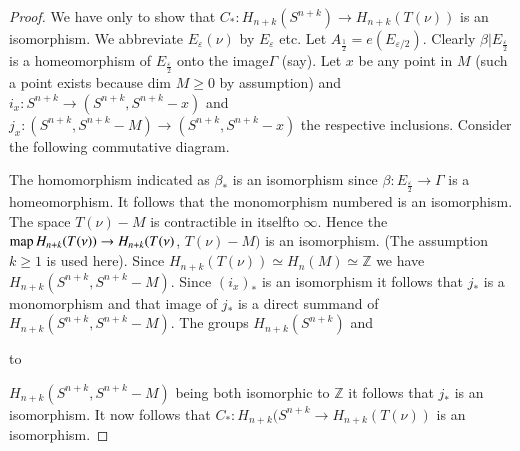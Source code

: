  \begin{proof}
We have only to show that $C_* : H_{n+k} (S^{n+k}) \to H_{n+k}
(T(\nu))$ is an isomorphism. We abbreviate $E_\varepsilon (\nu)$ by
$E_\varepsilon$ etc. Let $A_{\frac{1}{2}} = e(E_{\varepsilon/2})$. Clearly $\beta|
E_{\frac{\varepsilon}{2}}$ is a homeomorphism of $E_{\frac{\varepsilon}{2}}$ onto
the image\pageoriginale $\Gamma$ (say). Let $x$ be any point in $M$
(such a point exists because dim $M \geq 0$ by assumption) and $i_x :
S^{n+k} \to (S^{n+k}, S^{n+k} - x)$ and $j_x: (S^{n+k},
S^{n+k}-M) \to (S^{n+k}, S^{n+k}-x)$ the respective inclusions. Consider
the following commutative diagram.  

{\parfillskip=0pt
 The homomorphism indicated as $\beta_*$ is an isomorphism since
 $\beta : E_{\frac{\varepsilon}{2}} \to \Gamma$ is a homeomorphism. It
 follows that the monomorphism numbered  is an
 isomorphism. The space $T(\nu) - M$ is contractible in
 itself\pageoriginale to 
 $\infty$. Hence the $\operatorname{map} H_{n+k} (T (\nu)) \to H_{n+k} (T (\nu)$, $T
 (\nu) -M)$ is an isomorphism. (The assumption $k  \geq 1$ is used
 here). Since $H_{n+k} (T(\nu)) \simeq H_n (M) \simeq \mathbb{Z}$ we
 have $H_{n+k} (S^{n+k}, S^{n+k} -M)$. Since $(i_x)_*$ is an
 isomorphism it follows that $j_*$ is a monomorphism and that image of
 $j_*$ is a direct summand of $H_{n+k} (S^{n+k}, S^{n+k} - M)$. The
 groups $H_{n+k} (S^{n+k})$ and\par}  

\begin{landscape}
\vbox to
\end{landscape}
\noindent
$H_{n+k} (S^{n+k}, S^{n+k}-M)$ being
 both isomorphic to $\mathbb{Z}$ it follows that $j_*$ is an
 isomorphism. It now follows that $C_* : H_{n+k} (S^{n+k} \to H_{n+k}
 (T (\nu))$ is an isomorphism.

\end{proof}

